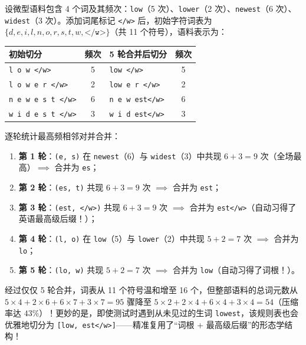 \begin{example}
\label{ex:bpe-trace}
设微型语料包含 4 个词及其频次：\texttt{low}（5 次）、\texttt{lower}（2 次）、\texttt{newest}（6 次）、\texttt{widest}（3 次）。添加词尾标记 \texttt{</w>} 后，初始字符词表为 $\{d, e, i, l, n, o, r, s, t, w, \texttt{</w>}\}$（共 11 个符号），语料表示为：
\begin{center}
\footnotesize
\begin{tabular}{@{}lclc@{}}
\toprule
\textbf{初始切分} & \textbf{频次} & \textbf{5 轮合并后切分} & \textbf{频次} \\
\midrule
\texttt{l o w </w>} & 5 & \texttt{low </w>} & 5 \\
\texttt{l o w e r </w>} & 2 & \texttt{low e r </w>} & 2 \\
\texttt{n e w e s t </w>} & 6 & \texttt{n e w est</w>} & 6 \\
\texttt{w i d e s t </w>} & 3 & \texttt{w i d est</w>} & 3 \\
\bottomrule
\end{tabular}
\end{center}
逐轮统计最高频相邻对并合并：
\begin{enumerate}
  \item \textbf{第 1 轮}：\texttt{(e, s)} 在 \texttt{newest}（6）与 \texttt{widest}（3）中共现 $6+3 = 9$ 次（全场最高）$\implies$ 合并为 \texttt{es}；
  \item \textbf{第 2 轮}：\texttt{(es, t)} 共现 $6+3 = 9$ 次 $\implies$ 合并为 \texttt{est}；
  \item \textbf{第 3 轮}：\texttt{(est, </w>)} 共现 $6+3 = 9$ 次 $\implies$ 合并为 \texttt{est</w>}（自动习得了英语最高级后缀！）；
  \item \textbf{第 4 轮}：\texttt{(l, o)} 在 \texttt{low}（5）与 \texttt{lower}（2）中共现 $5+2 = 7$ 次 $\implies$ 合并为 \texttt{lo}；
  \item \textbf{第 5 轮}：\texttt{(lo, w)} 共现 $5+2 = 7$ 次 $\implies$ 合并为 \texttt{low}（自动习得了词根！）。
\end{enumerate}
经过仅仅 5 轮合并，词表从 11 个符号温和增至 16 个，但整部语料的总词元数从 $5\times 4 + 2\times 6 + 6\times 7 + 3\times 7 = 95$ 骤降至 $5\times 2 + 2\times 4 + 6\times 4 + 3\times 4 = 54$（压缩率达 $43\%$）！更妙的是，即使测试时遇到从未见过的生词 \texttt{lowest}，该规则表也会优雅地切分为 \texttt{[low, est</w>]}——精准复用了“词根 + 最高级后缀”的形态学结构！
\end{example}

